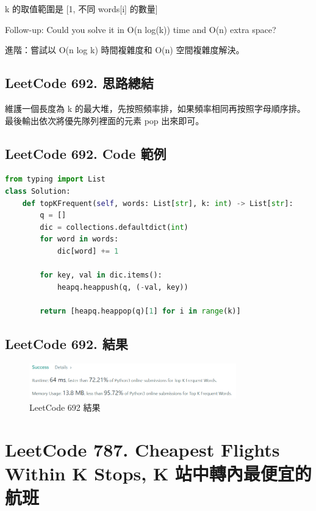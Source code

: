 \documentclass[10pt,UTF8]{ctexart}
\begin{document}
k 的取值範圍是 [1, 不同 words[i] 的數量]

Follow-up: Could you solve it in O(n log(k)) time and O(n) extra space?

進階：嘗試以 O(n log k) 時間複雜度和 O(n) 空間複雜度解決。


\subsection{LeetCode 692. 思路總結}

維護一個長度為 k 的最大堆，先按照頻率排，如果頻率相同再按照字母順序排。最後輸出依次將優先隊列裡面的元素 pop 出來即可。

\subsection{LeetCode 692. Code 範例}

\begin{lstlisting}[language={python}]
from typing import List
class Solution:
    def topKFrequent(self, words: List[str], k: int) -> List[str]:
        q = []
        dic = collections.defaultdict(int)
        for word in words:
            dic[word] += 1
        
        for key, val in dic.items():
            heapq.heappush(q, (-val, key))
        
        return [heapq.heappop(q)[1] for i in range(k)]
\end{lstlisting}

\subsection{LeetCode 692. 結果}

\begin{figure}[H]
\centering 
\includegraphics[width=0.80\textwidth]{lc-692-o.png} 
\caption{LeetCode 692 結果}
\label{Test}
\end{figure}


\newpage

\section{LeetCode 787. Cheapest Flights Within K Stops, K 站中轉內最便宜的航班}
\end{document}
